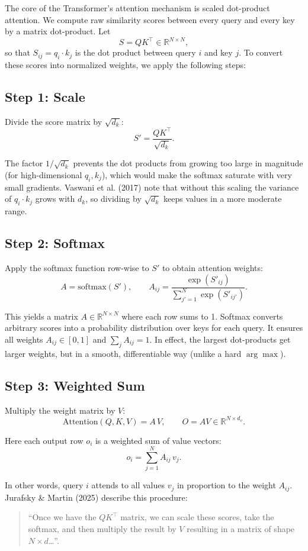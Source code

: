 \documentclass[11pt,a4paper]{article}
\begin{document}
The core of the Transformer's attention mechanism is scaled dot-product attention. We compute raw similarity scores between every query and every key by a matrix dot-product. Let 
$$S = QK^\top\in\mathbb{R}^{N\times N},$$
so that $S_{ij}=q_i\cdot k_j$ is the dot product between query $i$ and key $j$. To convert these scores into normalized weights, we apply the following steps:

\subsection{Step 1: Scale}
Divide the score matrix by $\sqrt{d_k}$:
$$S' = \frac{QK^\top}{\sqrt{d_k}}.$$

The factor $1/\sqrt{d_k}$ prevents the dot products from growing too large in magnitude (for high-dimensional $q_i,k_j$), which would make the softmax saturate with very small gradients. Vaswani et al. (2017) note that without this scaling the variance of $q_i\cdot k_j$ grows with $d_k$, so dividing by $\sqrt{d_k}$ keeps values in a more moderate range.

\subsection{Step 2: Softmax}
Apply the softmax function row-wise to $S'$ to obtain attention weights:
$$A = \text{softmax}(S'),\qquad A_{ij} = \frac{\exp(S'_{ij})}{\sum_{j'=1}^N \exp(S'_{ij'})}.$$

This yields a matrix $A\in\mathbb{R}^{N\times N}$ where each row sums to 1. Softmax converts arbitrary scores into a probability distribution over keys for each query. It ensures all weights $A_{ij}\in[0,1]$ and $\sum_j A_{ij}=1$. In effect, the largest dot-products get larger weights, but in a smooth, differentiable way (unlike a hard $\arg\max$).

\subsection{Step 3: Weighted Sum}
Multiply the weight matrix by $V$:
$$\text{Attention}(Q,K,V) = A\,V,\qquad O = AV\in\mathbb{R}^{N\times d_v}.$$

Here each output row $o_i$ is a weighted sum of value vectors:
$$o_i = \sum_{j=1}^N A_{ij}\,v_j.$$

In other words, query $i$ attends to all values $v_j$ in proportion to the weight $A_{ij}$. Jurafsky \& Martin (2025) describe this procedure:

\begin{quote}
``Once we have the $QK^\top$ matrix, we can scale these scores, take the softmax, and then multiply the result by $V$ resulting in a matrix of shape $N\times d$\ldots''.
\end{quote}
\end{document}
